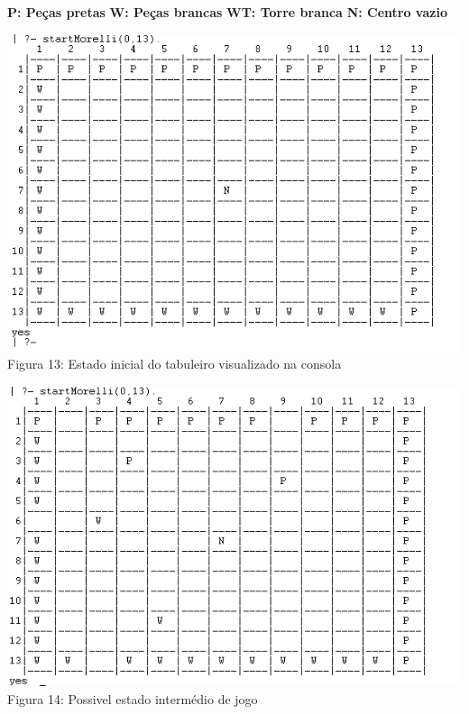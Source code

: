 \documentclass[a4paper]{article}
\begin{document}
\begin{center}

\textbf{P: Peças pretas} \linebreak\linebreak
\textbf{W: Peças brancas} \linebreak\linebreak
\textbf{WT: Torre branca} \linebreak\linebreak
\textbf{N: Centro vazio} \linebreak\linebreak


    \includegraphics[scale=0.9]{gameex1.png}\linebreak
Figura 13: Estado inicial do tabuleiro visualizado na consola \linebreak\linebreak

 \includegraphics[scale=0.9]{gameex2.png}\linebreak
Figura 14: Possivel estado intermédio de jogo \linebreak\linebreak


\end{center}
\end{document}
